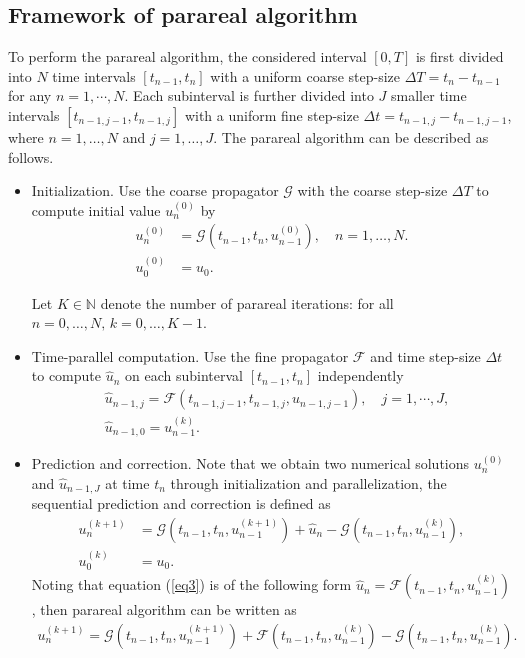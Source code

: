 \documentclass[preprint,12pt]{elsarticle}
\begin{document}
	\subsection{Framework of parareal algorithm}
	To perform the parareal algorithm, the considered interval $[0, T]$ is first divided into $N$ time intervals $[t_{n-1},t_{n}]$  with a uniform coarse step-size $\Delta T=t_{n}-t_{n-1}$ for any $n=1,\cdots,N$. Each subinterval is further divided into $J$ smaller time intervals $[t_{n-1,j-1}, t_{n-1,j}]$ with a uniform fine step-size $\Delta t = t_{n-1,j} - t_{n-1,j-1}$, where $n = 1, \dots, N$ and $j = 1, \dots, J$. The parareal algorithm can be described as follows.
	\begin{itemize}
		\item Initialization.	Use the coarse propagator $\mathcal{G}$ with the coarse step-size $\Delta T$ to compute initial value $u_{n}^{(0)}$ by
		\begin{align*}
			u_{n}^{(0)}&=\mathcal{G} (t_{n-1},t_{n},u_{n-1}^{(0)}),\quad n =1,\ldots ,N.\\
			u_{0}^{(0)}&=u_{0}.
		\end{align*}
		
		Let $K \in \mathbb{N}$ denote the number of parareal iterations: for all $n= 0,\ldots,N, \,k =0,\ldots,K-1$.
		\item Time-parallel computation.  Use the fine propagator $\mathcal{F}$ and  time step-size  $\Delta t$ to compute $\widehat u_{n}$ on each subinterval $[t_{n-1},t_{n}]$  independently
		\begin{align}\label{eq3}
			&\widehat u_{n-1,j}=\mathcal{F}(t_{n-1,j-1},t_{n-1,j},\widehat u_{n-1,j-1}), \quad j=1,\cdots,J ,\\
			&\widehat u_{n-1,0}=u_{n-1}^{(k)}.\nonumber
		\end{align}
		
		\item Prediction and correction. Note that we obtain two numerical solutions $u_{n}^{(0)}$ and $\widehat u_{n-1,J}$
		at time $t_{n}$ through initialization and parallelization, the sequential
		prediction and correction is defined as
		\begin{align}\label{eq4}
			u_{n}^{(k+1)}&=\mathcal{G} (t_{n-1},t_{n},u_{n-1}^{(k+1)})+\widehat u_{n}-\mathcal{G} (t_{n-1},t_{n},u_{n-1}^{(k)}),\\
			u_{0}^{(k)}&=u_{0}.\nonumber
		\end{align}
		Noting  that equation (\ref{eq3}) is of the following form $\widehat u_{n}=\mathcal{F}(t_{n-1},t_{n},u_{n-1}^{(k)})$, then parareal algorithm can be written as 
		\begin{align}\label{eq5}
			u_{n}^{(k+1)}=\mathcal{G} (t_{n-1},t_{n},u_{n-1}^{(k+1)})+\mathcal{F}(t_{n-1},t_{n},u_{n-1}^{(k)})-\mathcal{G} (t_{n-1},t_{n},u_{n-1}^{(k)}).
		\end{align}
	\end{itemize}
\end{document}
